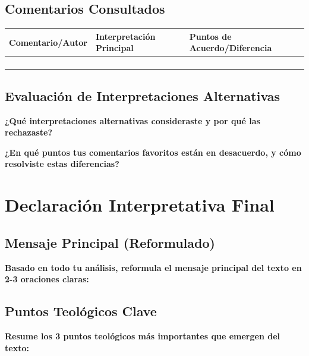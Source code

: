 \documentclass[11pt,a4paper]{article}
\begin{document}
\subsection{Comentarios Consultados}

\begin{tabularx}{\textwidth}{|X|X|X|}
\hline
\textbf{Comentario/Autor} & \textbf{Interpretación Principal} & \textbf{Puntos de Acuerdo/Diferencia} \\
\hline
& & \\[2cm]
\hline
& & \\[2cm]
\hline
& & \\[2cm]
\hline
& & \\[2cm]
\hline
\end{tabularx}

\subsection{Evaluación de Interpretaciones Alternativas}

\textbf{¿Qué interpretaciones alternativas consideraste y por qué las rechazaste?}
\vspace{3cm}

\textbf{¿En qué puntos tus comentarios favoritos están en desacuerdo, y cómo resolviste estas diferencias?}
\vspace{3cm}

\section{Declaración Interpretativa Final}

\subsection{Mensaje Principal (Reformulado)}

\begin{interpretationbox}
\textbf{Basado en todo tu análisis, reformula el mensaje principal del texto en 2-3 oraciones claras:}
\end{interpretationbox}

\vspace{4cm}

\subsection{Puntos Teológicos Clave}

\textbf{Resume los 3 puntos teológicos más importantes que emergen del texto:}
\end{document}

